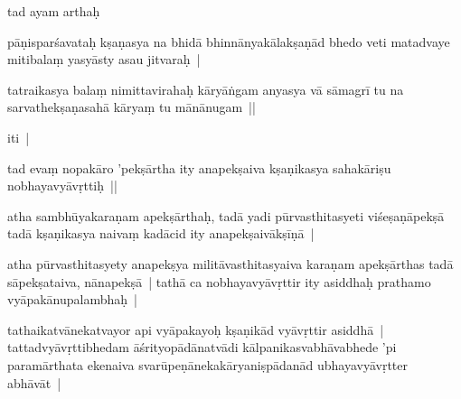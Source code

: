 \documentclass[article,12pt,a4paper]{memoir}%
\newcounter{parCount}
\begin{document}
	  
	  \pstart \leavevmode%
	\label{thakur75-81.9}tad ayam arthaḥ 
	{}
	\pend%
      

	  
	  \pstart \leavevmode%
	pāṇisparśavataḥ kṣaṇasya na bhidā bhinnānyakālakṣaṇād bhedo veti matadvaye mitibalaṃ yasyāsty asau jitvaraḥ |
	{}
	\pend%
      

	  
	  \pstart \leavevmode%
	tatraikasya balaṃ nimittavirahaḥ kāryāṅgam anyasya vā sāmagrī tu na sarvathekṣaṇasahā kāryaṃ tu mānānugam || 
	{}
	\pend%
      

	  
	  \pstart \leavevmode%
	iti |
	{}
	\pend%
      

	  
	  \pstart \leavevmode%
	\label{thakur75-81.14}tad evaṃ nopakāro 'pekṣārtha ity anapekṣaiva kṣaṇikasya sahakāriṣu nobhayavyāvṛttiḥ ||
	{}
	\pend%
      

	  
	  \pstart \leavevmode%
	\label{thakur75-81.15}atha sambhūyakaraṇam apekṣārthaḥ, tadā yadi pūrvasthitasyeti viśeṣaṇāpekṣā tadā kṣaṇikasya naivaṃ kadācid ity anapekṣaivākṣīṇā |
	{}
	\pend%
      

	  
	  \pstart \leavevmode%
	\label{thakur75-81.17}atha pūrvasthitasyety anapekṣya militāvasthitasyaiva karaṇam apekṣārthas tadā sāpekṣataiva, nānapekṣā | tathā ca nobhayavyāvṛttir ity asiddhaḥ prathamo vyāpakānupalambhaḥ | 
	{}
	\pend%
      

	  
	  \pstart \leavevmode%
	\label{thakur75-81.19}tathaikatvānekatvayor api vyāpakayoḥ kṣaṇikād vyāvṛttir asiddhā | tattadvyāvṛttibhedam āśrityopādānatvādi kālpanikasvabhāvabhede 'pi paramārthata ekenaiva svarūpeṇānekakāryaniṣpādanād ubhayavyāvṛtter abhāvāt |
	{}
	\pend%
      
\end{document}
